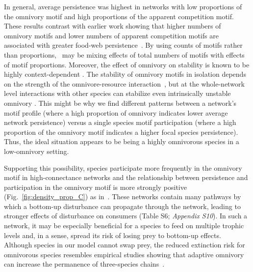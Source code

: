 \documentclass[12pt]{article}
\begin{document}
\begin{spacing}{2.0}
    
    In general, average persistence was highest in networks with low proportions of the omnivory motif and high proportions of the apparent competition motif. 
    These results contrast with earlier work showing that higher numbers of omnivory motifs and lower numbers of apparent competition motifs are associated with greater food-web persistence~\citep{Stouffer2010b}.
    By using counts of motifs rather than proportions,~\citet{Stouffer2010b} may be mixing effects of total numbers of motifs with effects of motif proportions.
    Moreover, the effect of omnivory on stability is known to be highly context-dependent \citep{bascompte2005simple, Monteiro2016,McLeod2021}. 
    The stability of omnivory motifs in isolation depends on the strength of the omnivore-resource interaction~\citep{McLeod2021}, but at the whole-network level interactions with other species can stabilize even intrinsically unstable omnivory \citep{Kratina2012}. 
    This might be why we find different patterns between a network's motif profile (where a high proportion of omnivory indicates lower average network persistence) versus a single species motif participation (where a high proportion of the omnivory motif indicates a higher focal species persistence).
    Thus, the ideal situation appears to be being a highly omnivorous species in a low-omnivory setting. 
    
    Supporting this possibility, species participate more frequently in the omnivory motif in high-connectance networks and the relationship between persistence and participation in the omnivory motif is more strongly positive (Fig.~\ref{fig:density_prop_C}) as in~\citep{McLeod2021}.
    These networks contain many pathways by which a bottom-up disturbance can propagate through the network, leading to stronger effects of disturbance on consumers (Table S6; \emph{Appendix S10}).
    In such a network, it may be especially beneficial for a species to feed on multiple trophic levels and, in a sense, spread its risk of losing prey to bottom-up effects.
    Although species in our model cannot swap prey, the reduced extinction risk for omnivorous species resembles empirical studies showing that adaptive omnivory can increase the permanence of three-species chains~\citep{Fagan1997, Kvrivan2005, AbramsFung2010}.
    

\end{spacing}
\end{document}
